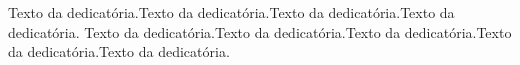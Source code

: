 

\begin{dedicatoria}
Texto da dedicatória.Texto da dedicatória.Texto da dedicatória.Texto da dedicatória.
Texto da dedicatória.Texto da dedicatória.Texto da dedicatória.Texto da dedicatória.Texto da dedicatória.
\end{dedicatoria}




